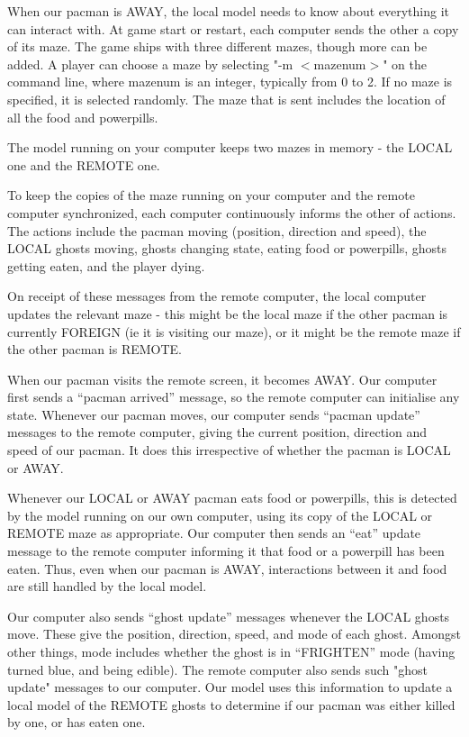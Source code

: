 \documentclass{article}
\begin{document}
When our pacman is AWAY, the local model needs to know about
everything it can interact with.  At game start or restart, each
computer sends the other a copy of its maze.  The game ships with
three different mazes, though more can be added.  A player can choose
a maze by selecting "-m $<$mazenum$>$" on the command line, where
mazenum is an integer, typically from 0 to 2.  If no maze is
specified, it is selected randomly.  The maze that is sent includes
the location of all the food and powerpills.

The model running on your computer keeps two mazes in memory - the
 LOCAL one and the REMOTE one.

To keep the copies of the maze running on your computer and the remote
computer synchronized, each computer continuously informs the other of
actions.  The actions include the pacman moving (position, direction
and speed), the LOCAL ghosts moving, ghosts changing state, eating
food or powerpills, ghosts getting eaten, and the player dying.

On receipt of these messages from the remote computer, the local
computer updates the relevant maze - this might be the local maze if
the other pacman is currently FOREIGN (ie it is visiting our maze), or
it might be the remote maze if the other pacman is REMOTE.

When our pacman visits the remote screen, it becomes AWAY.  Our
computer first sends a ``pacman arrived'' message, so the remote
computer can initialise any state.  Whenever our pacman moves, our
computer sends ``pacman update'' messages to the remote computer,
giving the current position, direction and speed of our pacman.  It
does this irrespective of whether the pacman is LOCAL or AWAY.

Whenever our LOCAL or AWAY pacman eats food or powerpills, this is
detected by the model running on our own computer, using its copy of
the LOCAL or REMOTE maze as appropriate.  Our computer then sends an
``eat'' update message to the remote computer informing it that food
or a powerpill has been eaten.  Thus, even when our pacman is AWAY,
interactions between it and food are still handled by the local model.

Our computer also sends ``ghost update'' messages whenever the LOCAL
 ghosts move.  These give the position, direction, speed, and mode of
 each ghost.  Amongst other things, mode includes whether the ghost is
 in ``FRIGHTEN'' mode (having turned blue, and being edible).  The
 remote computer also sends such "ghost update" messages to our
 computer. Our model uses this information to update a local model of
 the REMOTE ghosts to determine if our pacman was either killed by
 one, or has eaten one.
\end{document}
